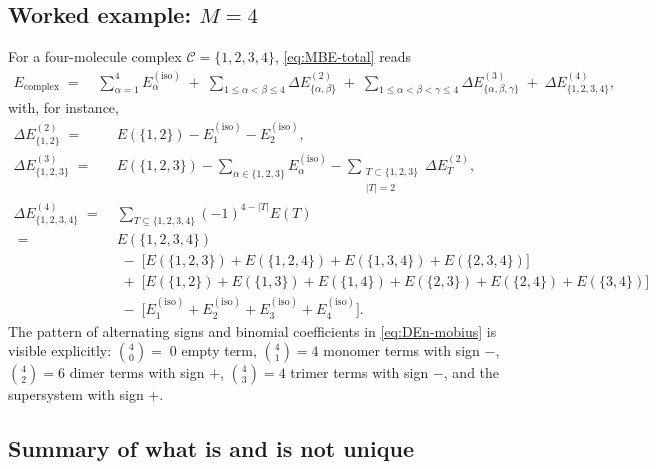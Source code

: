 \documentclass[11pt,a4paper]{article}
\newcommand{\Eiso}{E^{(\mathrm{iso})}}
\newcommand{\Ecpl}{E_{\mathrm{complex}}}
\begin{document}
\subsection{Worked example: $M = 4$}

For a four-molecule complex $\mathcal{C} = \{1,2,3,4\}$, \cref{eq:MBE-total}
reads
\begin{equation}
\begin{aligned}
\Ecpl \;=\;& \sum_{\alpha=1}^{4} \Eiso_\alpha
\;+\; \sum_{1 \le \alpha < \beta \le 4} \Delta E^{(2)}_{\{\alpha,\beta\}}
\;+\; \sum_{1 \le \alpha < \beta < \gamma \le 4} \Delta E^{(3)}_{\{\alpha,\beta,\gamma\}}
\;+\; \Delta E^{(4)}_{\{1,2,3,4\}},
\end{aligned}
\end{equation}
with, for instance,
\begin{align}
\Delta E^{(2)}_{\{1,2\}} \;=\;& E(\{1,2\}) - \Eiso_1 - \Eiso_2, \\
\Delta E^{(3)}_{\{1,2,3\}} \;=\;& E(\{1,2,3\})
   - \!\!\sum_{\alpha \in \{1,2,3\}} \!\! \Eiso_\alpha
   - \!\!\!\!\sum_{\substack{T \subset \{1,2,3\} \\ |T|=2}} \!\!\!\! \Delta E^{(2)}_T, \\
\Delta E^{(4)}_{\{1,2,3,4\}} \;=\;& \sum_{T \subseteq \{1,2,3,4\}} (-1)^{4-|T|} E(T) \nonumber\\
   \;=\;& E(\{1,2,3,4\}) \nonumber\\
   &\;-\; \big[E(\{1,2,3\}) + E(\{1,2,4\}) + E(\{1,3,4\}) + E(\{2,3,4\})\big] \nonumber\\
   &\;+\; \big[E(\{1,2\}) + E(\{1,3\}) + E(\{1,4\}) + E(\{2,3\}) + E(\{2,4\}) + E(\{3,4\})\big] \nonumber\\
   &\;-\; \big[\Eiso_1 + \Eiso_2 + \Eiso_3 + \Eiso_4\big].
\end{align}
The pattern of alternating signs and binomial coefficients in
\cref{eq:DEn-mobius} is visible explicitly: $\binom{4}{0}{=}\;0$ empty term,
$\binom{4}{1}=4$ monomer terms with sign $-$, $\binom{4}{2}=6$ dimer terms with
sign $+$, $\binom{4}{3}=4$ trimer terms with sign $-$, and the supersystem with
sign $+$.

\subsection{Summary of what is and is not unique}
\end{document}
